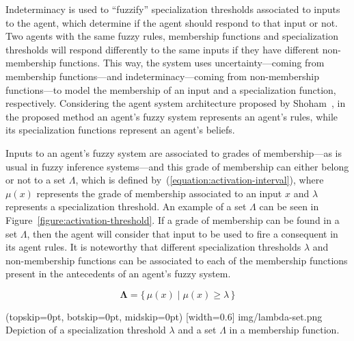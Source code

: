 \documentclass{ieeeaccess}
\begin{document}
Indeterminacy is used to ``fuzzify'' specialization thresholds associated to inputs to the agent, which determine if the agent should respond to that
input or not. Two agents with the same fuzzy rules, membership functions and specialization thresholds will respond differently to the
same inputs if they have different non-membership functions. This way, the system uses uncertainty---coming from membership functions---and
indeterminacy---coming from non-membership functions---to model the membership of an input and a specialization function, respectively. Considering the agent system architecture proposed by Shoham~\cite{Shoham1993}, in the proposed method an agent's fuzzy system represents an agent's rules, while its specialization functions represent an agent's beliefs.

Inputs to an agent's fuzzy system are associated to grades of membership---as is usual in fuzzy inference systems---and this grade of membership can either belong or not to a set $\Lambda$, which is defined by~(\ref{equation:activation-interval}), where $\mu(x)$ represents the grade of membership associated to an input $x$ and $\lambda$ represents a specialization threshold. An example of a set $\Lambda$ can be seen in Figure~\ref{figure:activation-threshold}. If a grade of membership can be found in a set $\Lambda$, then the agent will consider that input to be used to fire a consequent in its agent
rules. It is noteworthy that different specialization thresholds $\lambda$ and non-membership functions can be associated to each of the
membership functions present in the antecedents of an agent's fuzzy system.

\begin{equation}
  \label{equation:activation-interval}
  \bm{\Lambda} = \{\,\mu(x) \mid \mu(x) \geq \lambda \,\}
\end{equation}

\Figure[](topskip=0pt, botskip=0pt, midskip=0pt)
[width=0.6\linewidth]
{img/lambda-set.png}
{Depiction of a specialization threshold $\lambda$ and a set $\Lambda$ in a membership function.
  \label{figure:activation-threshold}}
\end{document}

